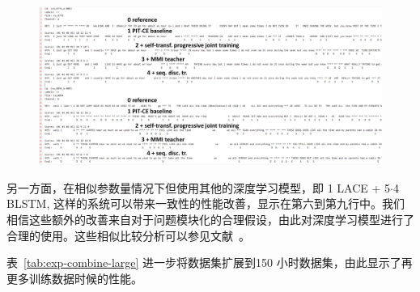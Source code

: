 \begin{figure}[!htp]
  \centering
    \captionstyle{\centering}
    \includegraphics[width=\textwidth]{figure/pit-example.pdf}
\end{figure}


另一方面，在相似参数量情况下但使用其他的深度学习模型，即 {1 LACE + 5$\cdot$4 BLSTM}, 这样的系统可以带来一致性的性能改善，显示在第六到第九行中。我们相信这些额外的改善来自对于问题模块化的合理假设，由此对深度学习模型进行了合理的使用。这些相似比较分析可以参见文献~\cite{chen2018progressive}。



表~\ref{tab:exp-combine-large} 进一步将数据集扩展到150 小时数据集，由此显示了再更多训练数据时候的性能。


